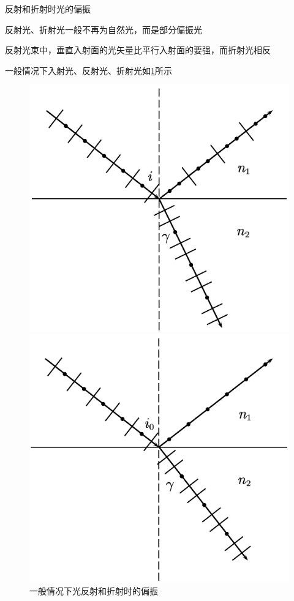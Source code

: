 \documentclass[12pt, a4paper, twoside]{ctexbook}
\begin{document}
{\sonti 反射和折射时光的偏振}

反射光、折射光一般不再为自然光，而是部分偏振光

反射光束中，垂直入射面的光矢量比平行入射面的要强，而折射光相反

一般情况下入射光、反射光、折射光如\textcolor{blue}{\cref{fig:一般反射折射}}所示
\begin{figure}[H]
    \centering
    \begin{minipage}{0.48\linewidth}
        \centering
        \includegraphics[scale=0.66]{一般反射折射.pdf}
        \caption{一般情况下光反射和折射时的偏振}
        \label{fig:一般反射折射}
    \end{minipage}
    \begin{minipage}{0.48\linewidth}
        \centering
        \includegraphics[scale=0.66]{布儒斯特角入射情况反射折射.pdf}

\end{minipage}
\end{figure}
\end{document}
